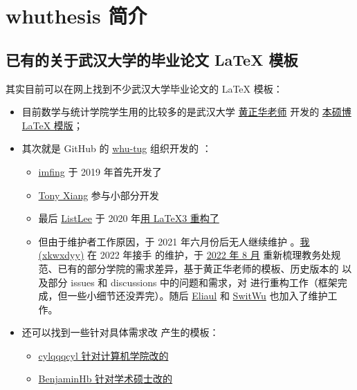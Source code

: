 
\chapter{whuthesis 简介}


\section{已有的关于武汉大学的毕业论文 \LaTeX{} 模板}

其实目前可以在网上找到不少武汉大学毕业论文的 \LaTeX{} 模板：
\begin{itemize}
  \item 目前数学与统计学院学生用的比较多的是武汉大学 \href{http://aff.whu.edu.cn/huangzh/}{黄正华老师} 开发的 \href{http://aff.whu.edu.cn/huangzh/#:~:text=%E4%B8%8B%E5%88%97-,%E6%AF%95%E4%B8%9A%E8%AE%BA%E6%96%87%E6%A8%A1%E6%9D%BF,-%2C%20%E9%80%82%E7%94%A8%E4%BA%8E%20TeX}{本硕博 \LaTeX{} 模版}；
  \item 其次就是 GitHub 的 \href{https://github.com/whutug}{whu-tug} 组织开发的 \href{https://github.com/whutug/whu-thesis}{}：
    \begin{itemize}
      \item \href{https://github.com/imfing}{imfing} 于 2019 年首先开发了 
      \item \href{https://github.com/T0nyX1ang}{Tony Xiang} 参与小部分开发
      \item 最后 \href{https://github.com/tanukihee}{ListLee} 于 2020 年\href{https://github.com/whutug/whu-thesis/commit/d488438b7819ddf5a128081a50b118d8fd4ec1ef}{用 \LaTeX3 重构了 }
      \item 但由于维护者工作原因，于 2021 年六月份后无人继续维护 。\href{https://github.com/xkwxdyy}{我(xkwxdyy)} 在 2022 年接手  的维护，于 \href{https://github.com/whutug/whu-thesis/commit/bfaf2c235e7490fa16ce40ec6eb20ce060592a9d}{2022 年 8 月} 重新梳理教务处规范、已有的部分学院的需求差异，基于黄正华老师的模板、历史版本的  以及部分 issues 和 discussions 中的问题和需求，对  进行重构工作（框架完成，但一些小细节还没弄完）。随后 \href{https://github.com/Eliaul}{Eliaul} 和 \href{https://github.com/SwitWu}{SwitWu} 也加入了维护工作。
    \end{itemize}
  \item 还可以找到一些针对具体需求改  产生的模板：
    \begin{itemize}
      \item \href{https://github.com/cylqqqcyl/whu-thesis-2024}{cylqqqcyl 针对计算机学院改的}
      \item \href{https://github.com/BenjaminHb/whu-thesis}{BenjaminHb 针对学术硕士改的}
    \end{itemize}
\end{itemize}


